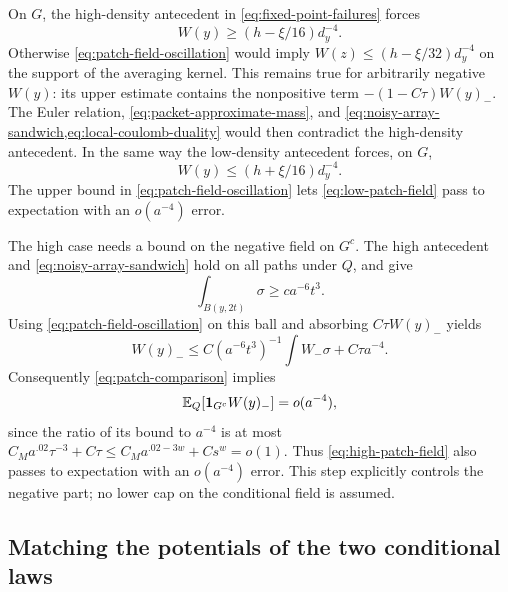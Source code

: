 On $G$, the high-density antecedent in
\cref{eq:fixed-point-failures} forces
\begin{equation}
 W(y)\geq(h-\xi/16)d_y^{-4}.
 \label{eq:high-patch-field}
\end{equation}
Otherwise \cref{eq:patch-field-oscillation} would imply
$W(z)\leq(h-\xi/32)d_y^{-4}$ on the support of the averaging kernel.
This remains true for arbitrarily negative $W(y)$: its upper estimate
contains the nonpositive term $-(1-C\tau)W(y)_-$.
The Euler relation, \cref{eq:packet-approximate-mass}, and
\cref{eq:noisy-array-sandwich,eq:local-coulomb-duality} would then
contradict the high-density antecedent.  In the same way the low-density
antecedent forces, on $G$,
\begin{equation}
 W(y)\leq(h+\xi/16)d_y^{-4}.
 \label{eq:low-patch-field}
\end{equation}
The upper bound in \cref{eq:patch-field-oscillation} lets
\cref{eq:low-patch-field} pass to expectation with an $o(a^{-4})$ error.

The high case needs a bound on the negative field on $G^c$.
The high antecedent and \cref{eq:noisy-array-sandwich} hold on all paths
under $Q$, and give
\[
 \int_{B(y,2t)}\sigma\geq ca^{-6}t^3.
\]
Using \cref{eq:patch-field-oscillation} on this ball and absorbing
$C\tau W(y)_-$ yields
\begin{equation}
 W(y)_-\leq C(a^{-6}t^3)^{-1}\int W_-\sigma+C\tau a^{-4}.
 \label{eq:negative-patch-control}
\end{equation}
Consequently \cref{eq:patch-comparison} implies
\[
 \mathbb E_Q[\mathbf 1_{G^c}W(y)_-]=o(a^{-4}),
\]
since the ratio of its bound to $a^{-4}$ is at most
$C_Ma^{.02}\tau^{-3}+C\tau
 \leq C_Ma^{.02-3w}+Cs^w=o(1)$.
Thus \cref{eq:high-patch-field} also passes to expectation with
an $o(a^{-4})$ error.  This step explicitly controls the negative part;
no lower cap on the conditional field is assumed.

\subsection{Matching the potentials of the two conditional laws}

